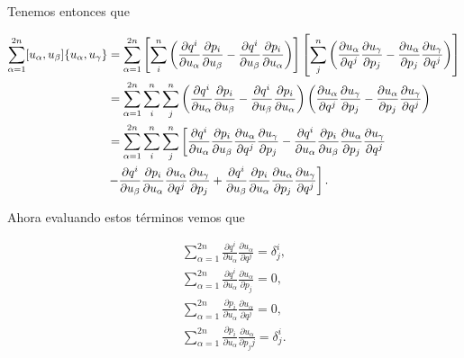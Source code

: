 \documentclass[a4paper,10pt]{article}
\numberwithin{equation}{section}
\newcommand{\zerodel}{.\kern-\nulldelimiterspace}
\begin{document}
Tenemos entonces que 

\begin{align*}
\sum_{\alpha=1}^{2n} [u_\alpha,u_\beta]\{u_\alpha,u_\gamma\} &= 
\sum_{\alpha=1}^{2n} \left[\sum_i^n \left( \frac{\partial q^i}{\partial u_\alpha}
 \frac{\partial p_i}{\partial u_\beta}- \frac{\partial q^i}{\partial u_\beta}
 \frac{\partial p_i}{\partial u_\alpha}\right) \right] \left[ \sum_j^n \left( \frac{\partial u_\alpha}{\partial q^j}
 \frac{\partial u_\gamma}{\partial p_j} - \frac{\partial u_\alpha}{\partial p_j}
 \frac{\partial u_\gamma}{\partial q^j} \right)\right] \\
 &= \sum_{\alpha=1}^{2n} \sum_i^n \sum_j^n \left( \frac{\partial q^i}{\partial u_\alpha}
 \frac{\partial p_i}{\partial u_\beta}- \frac{\partial q^i}{\partial u_\beta}
 \frac{\partial p_i}{\partial u_\alpha}\right)\left( \frac{\partial u_\alpha}{\partial q^j}
 \frac{\partial u_\gamma}{\partial p_j} - \frac{\partial u_\alpha}{\partial p_j}
 \frac{\partial u_\gamma}{\partial q^j} \right) \\
 &= \sum_{\alpha=1}^{2n} \sum_i^n \sum_j^n \left[\frac{\partial q^i}{\partial u_\alpha}
 \frac{\partial p_i}{\partial u_\beta} \frac{\partial u_\alpha}{\partial q^j}
 \frac{\partial u_\gamma}{\partial p_j} - \frac{\partial q^i}{\partial u_\alpha}
 \frac{\partial p_i}{\partial u_\beta}\frac{\partial u_\alpha}{\partial p_j}
 \frac{\partial u_\gamma}{\partial q^j}  \right\zerodel \\
 &\left\zerodel- \frac{\partial q^i}{\partial u_\beta}\frac{\partial p_i}{\partial u_\alpha}
 \frac{\partial u_\alpha}{\partial q^j}\frac{\partial u_\gamma}{\partial p_j} + 
 \frac{\partial q^i}{\partial u_\beta}\frac{\partial p_i}{\partial u_\alpha}
 \frac{\partial u_\alpha}{\partial p_j}\frac{\partial u_\gamma}{\partial q^j}\right].
\end{align*}

Ahora evaluando estos términos vemos que 

\begin{align}
 \sum_{\alpha=1}^{2n} \frac{\partial q^i}{\partial u_\alpha}
 \frac{\partial u_\alpha}{\partial q^j} = \delta^i_j, \\
  \sum_{\alpha=1}^{2n} \frac{\partial q^i}{\partial u_\alpha}
 \frac{\partial u_\alpha}{\partial p_j} = 0, \\
  \sum_{\alpha=1}^{2n} \frac{\partial p_i}{\partial u_\alpha}
 \frac{\partial u_\alpha}{\partial q^j} = 0, \\
  \sum_{\alpha=1}^{2n} \frac{\partial p_i}{\partial u_\alpha}
 \frac{\partial u_\alpha}{\partial p_jj} = \delta^i_j.
\end{align}
\end{document}
